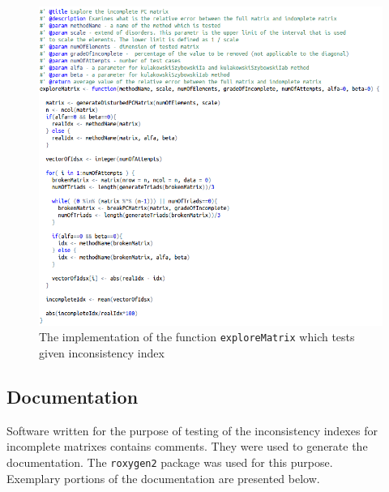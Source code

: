 \begin{figure}[h]
\centerline{\includegraphics[scale=0.58]{images/kod21.png}}
\caption{The implementation of the function \texttt{exploreMatrix} which tests given inconsistency index}
\end{figure}



\clearpage
\subsection{Documentation}
Software written for the purpose of testing of the inconsistency indexes for incomplete matrixes contains comments. They were used to generate the documentation. The \texttt{roxygen2} package was used for this purpose. \\ Exemplary portions of the documentation are presented below.



